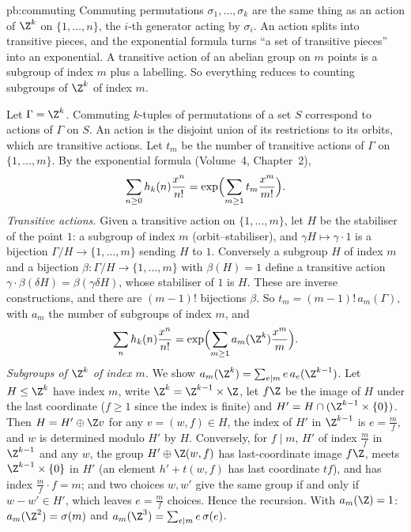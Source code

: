 \begin{solution}{pb:commuting}
\idea Commuting permutations $\sigma_1,\dots,\sigma_k$ are the same thing as an action of $\Z^k$ on $\{1,\dots,n\}$, the $i$-th
generator acting by $\sigma_i$. An action splits into transitive pieces, and the exponential formula turns ``a set of
transitive pieces'' into an exponential. A transitive action of an abelian group on $m$ points is a subgroup of index $m$ plus a
labelling. So everything reduces to counting subgroups of $\Z^k$ of index $m$.

\writeup Let $\Gamma=\Z^k$. Commuting $k$-tuples of permutations of a set $S$ correspond to actions of $\Gamma$ on $S$. An action
is the disjoint union of its restrictions to its orbits, which are transitive actions. Let $t_m$ be the number of transitive
actions of $\Gamma$ on $\{1,\dots,m\}$. By the exponential formula (Volume~4, Chapter~2),
\[
\sum_{n\ge0}h_k(n)\frac{x^n}{n!}=\exp\Bigl(\sum_{m\ge1}t_m\frac{x^m}{m!}\Bigr).
\]
\emph{Transitive actions.} Given a transitive action on $\{1,\dots,m\}$, let $H$ be the stabiliser of the point $1$: a subgroup
of index $m$ (orbit--stabiliser), and $\gamma H\mapsto\gamma\cdot1$ is a bijection $\Gamma/H\to\{1,\dots,m\}$ sending $H$ to $1$.
Conversely a subgroup $H$ of index $m$ and a bijection $\beta:\Gamma/H\to\{1,\dots,m\}$ with $\beta(H)=1$ define a transitive action
$\gamma\cdot\beta(\delta H)=\beta(\gamma\delta H)$, whose stabiliser of $1$ is $H$. These are inverse constructions, and there are
$(m-1)!$ bijections $\beta$. So $t_m=(m-1)!\,a_m(\Gamma)$, with $a_m$ the number of subgroups of index $m$, and
\[
\sum_nh_k(n)\frac{x^n}{n!}=\exp\Bigl(\sum_{m\ge1}a_m(\Z^k)\frac{x^m}m\Bigr).
\]
\emph{Subgroups of $\Z^k$ of index $m$.} We show $a_m(\Z^k)=\sum_{e\mid m}e\,a_e(\Z^{k-1})$. Let $H\le\Z^k$ have index $m$, write
$\Z^k=\Z^{k-1}\times\Z$, let $f\Z$ be the image of $H$ under the last coordinate ($f\ge1$ since the index is finite) and
$H'=H\cap(\Z^{k-1}\times\{0\})$. Then $H=H'\oplus\Z v$ for any $v=(w,f)\in H$, the index of $H'$ in $\Z^{k-1}$ is $e=\frac mf$, and $w$ is
determined modulo $H'$ by $H$. Conversely, for $f\mid m$, $H'$ of index $\frac mf$ in $\Z^{k-1}$ and any $w$, the group
$H'\oplus\Z(w,f)$ has last-coordinate image $f\Z$, meets $\Z^{k-1}\times\{0\}$ in $H'$ (an element $h'+t(w,f)$ has last coordinate
$tf$), and has index $\frac mf\cdot f=m$; and two choices $w,w'$ give the same group if and only if $w-w'\in H'$, which leaves
$e=\frac mf$ choices. Hence the recursion. With $a_m(\Z)=1$: $a_m(\Z^2)=\sigma(m)$ and $a_m(\Z^3)=\sum_{e\mid m}e\,\sigma(e)$.


\end{solution}
